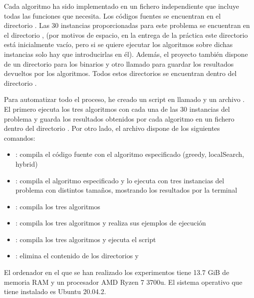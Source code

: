 \documentclass[10pt,a4paper]{article}
\begin{document}
Cada algoritmo ha sido implementado en un fichero independiente que incluye todas las funciones que necesita. Los códigos fuentes se encuentran en el directorio . Las 30 instancias proporcionadas para este problema se encuentran en el directorio , (por motivos de espacio, en la entrega de la práctica este directorio está inicialmente vacío, pero si se quiere ejecutar los algoritmos sobre dichas instancias solo hay que introducirlas en él). Además, el proyecto también dispone de un directorio  para los binarios y otro llamado  para guardar los resultados devueltos por los algoritmos. Todos estos directorios se encuentran dentro del directorio .

Para automatizar todo el proceso, he creado un script en  llamado  y un archivo . El primero ejecuta los tres algoritmos con cada una de las 30 instancias del problema y guarda los resultados obtenidos por cada algoritmo en un fichero  dentro del directorio . Por otro lado, el archivo  dispone de los siguientes comandos:

\begin{itemize}
	\item {}: compila el código fuente con el algoritmo especificado (greedy, localSearch, hybrid)
	\item {}: compila el algoritmo especificado y lo ejecuta con tres instancias del problema con distintos tamaños, mostrando los resultados por la terminal
	\item {}: compila los tres algoritmos
	\item {}: compila los tres algoritmos y realiza sus ejemplos de ejecución
	\item {}: compila los tres algoritmos y ejecuta el script 
	\item {}: elimina el contenido de los directorios  y 
\end{itemize}

El ordenador en el que se han realizado los experimentos tiene 13.7 GiB de memoria RAM y un procesador AMD Ryzen 7 3700u. El sistema operativo que tiene instalado es Ubuntu 20.04.2.
\end{document}
